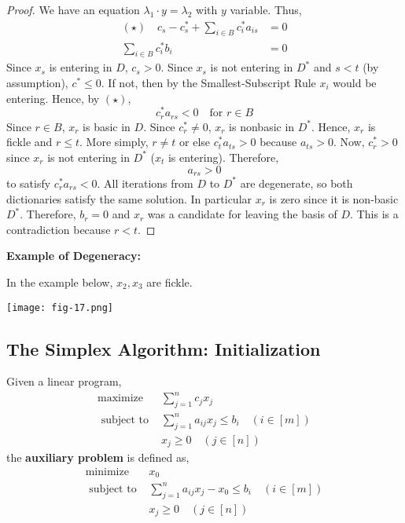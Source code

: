 \begin{proof}
		\noindent We have an equation $\lambda_1 \cdot y = \lambda_2$ with $y$ variable. Thus,
		\begin{align*}
			(\star) \quad c_{s}-c_{s}^{*}+\sum_{i \in B} c_{i}^{*} a_{i s}&=0 \\
			\sum_{i \in B} c_{i}^{*} b_{i} &= 0
		\end{align*}
		Since $x_s$ is entering in $D$, $c_s > 0$. Since $x_s$ is not entering in $D^*$ and $s < t$ (by assumption), $c^* \leq 0$. If not, then by the Smallest-Subscript Rule $x_i$ would be entering. Hence, by $(\star)$,
		\[c^*_r a_{rs} < 0 \quad \text{for $r \in B$}\]
		\noindent Since $r \in B$, $x_r$ is basic in $D$. Since $c_r^* \neq 0$, $x_r$ is nonbasic in $D^*$. Hence, $x_r$ is fickle and $r \leq t$. More simply, $r \neq t$ or else $c_t^* a_{ts} > 0$ because $a_{ts} > 0$. Now, $c_r^* > 0$ since $x_r$ is not entering in $D^*$ ($x_t$ is entering). Therefore,
		\[a_{rs} > 0\]
		\noindent to satisfy $c^*_r a_{rs} < 0$. All iterations from $D$ to $D^*$ are degenerate, so both dictionaries satisfy the same solution. In particular $x_r$ is zero since it is non-basic $D^*$. Therefore, $b_r = 0$ and $x_r$ was a candidate for leaving the basis of $D$. This is a contradiction because $r < t$.
	\end{proof}

	\begin{marginfigure}
		\textbf{Example of Degeneracy:}

		\noindent In the example below, $x_2, x_3$ are fickle.

		\begin{center}
		\texttt{[image: fig-17.png]}
		\end{center}
	\end{marginfigure}

	\subsection{The Simplex Algorithm: Initialization}
	\begin{defn}
		Given a linear program,
		\[
				\begin{array}{cc}
				\operatorname{maximize} & \sum_{j = 1}^n c_jx_j \\
				\text{ subject to } & \sum_{j=1}^{n} a_{i j} x_{j} \leq b_{i} \quad(i \in [m]) \\
				& x_{j} \geq 0 \quad(j \in [n]) 
			\end{array}
		\]
	\noindent the \textbf{auxiliary problem} is defined as,
		\[
			\begin{array}{cc}
				\operatorname{minimize} & x_{0} \\
				\text{ subject to } & \sum_{j=1}^{n} a_{i j} x_{j}-x_{0} \leq b_{i} \quad(i \in [m]) \\
				& x_{j} \geq 0 \quad(j \in [n]) 
			\end{array}
		\]
	\end{defn}

